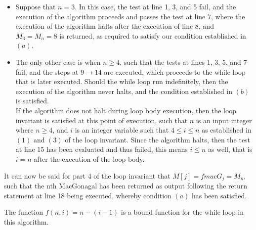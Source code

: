 \documentclass[12pt]{article}
\newenvironment{problem}[2][Problem]{\begin{trivlist}
\item[\hskip \labelsep {\bfseries #1}\hskip \labelsep {\bfseries #2.}]}{\end{trivlist}}
\begin{document}
\begin{problem}{8}
\begin{itemize}
\item Suppose that $n = 3$. In this case, the test at line 1, 3, and 5 fail, and the execution of the algorithm proceeds and passes the test at line 7, where the execution of the algorithm halts after the execution of line 8, and $M_3 = M_n = 8$ is returned, as required to satisfy our condition established in $(a)$.

\item The only other case is when $n \geq 4$, such that the tests at lines 1, 3, 5, and 7 fail, and the steps at $9 \rightarrow 14$ are executed, which proceeds to the while loop that is later executed. Should the while loop run indefinitely, then the execution of the algorithm never halts, and the condition established in $(b)$ is satisfied. \\

If the algorithm does not halt during loop body execution, then the loop invariant is satisfied at this point of execution, such that $n$ is an input integer where $n \geq 4$, and $i$ is an integer variable such that $4 \leq i \leq n$ as established in $(1)$ and $(3)$ of the loop invariant. Since the algorithm halts, then the test at line 15 has been evaluated and thus failed, this means $i \leq n$ as well, that is $i = n$ after the execution of the loop body.

\end{itemize}

\noindent
It can now be said for part 4 of the loop invariant that $M[j] = fmacG_j = M_n$, such that the nth MacGonagal has been returned as output following the return statement at line 18 being executed, whereby condition $(a)$ has been satisfied.

\end{problem}


\begin{problem}{9}
    The function $f\left(n,i\right) = n - (i - 1)$ is a bound function for the while
    loop in this algorithm. 
\end{problem}
\end{document}

